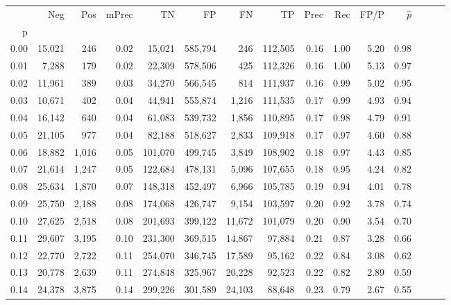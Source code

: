 \begin{tabular}{rrrrrrrrrrrrrrr}
\toprule
{} &     Neg &    Pos & mPrec &       TN &       FP &       FN &       TP &  Prec &   Rec &  FP/P & $\hat{p}$ \\
p    &         &        &       &          &          &          &          &       &       &       &           \\
\midrule
0.00 &  15,021 &    246 &  0.02 &   15,021 &  585,794 &      246 &  112,505 &  0.16 &  1.00 &  5.20 &      0.98 \\
0.01 &   7,288 &    179 &  0.02 &   22,309 &  578,506 &      425 &  112,326 &  0.16 &  1.00 &  5.13 &      0.97 \\
0.02 &  11,961 &    389 &  0.03 &   34,270 &  566,545 &      814 &  111,937 &  0.16 &  0.99 &  5.02 &      0.95 \\
0.03 &  10,671 &    402 &  0.04 &   44,941 &  555,874 &    1,216 &  111,535 &  0.17 &  0.99 &  4.93 &      0.94 \\
0.04 &  16,142 &    640 &  0.04 &   61,083 &  539,732 &    1,856 &  110,895 &  0.17 &  0.98 &  4.79 &      0.91 \\
0.05 &  21,105 &    977 &  0.04 &   82,188 &  518,627 &    2,833 &  109,918 &  0.17 &  0.97 &  4.60 &      0.88 \\
0.06 &  18,882 &  1,016 &  0.05 &  101,070 &  499,745 &    3,849 &  108,902 &  0.18 &  0.97 &  4.43 &      0.85 \\
0.07 &  21,614 &  1,247 &  0.05 &  122,684 &  478,131 &    5,096 &  107,655 &  0.18 &  0.95 &  4.24 &      0.82 \\
0.08 &  25,634 &  1,870 &  0.07 &  148,318 &  452,497 &    6,966 &  105,785 &  0.19 &  0.94 &  4.01 &      0.78 \\
0.09 &  25,750 &  2,188 &  0.08 &  174,068 &  426,747 &    9,154 &  103,597 &  0.20 &  0.92 &  3.78 &      0.74 \\
0.10 &  27,625 &  2,518 &  0.08 &  201,693 &  399,122 &   11,672 &  101,079 &  0.20 &  0.90 &  3.54 &      0.70 \\
0.11 &  29,607 &  3,195 &  0.10 &  231,300 &  369,515 &   14,867 &   97,884 &  0.21 &  0.87 &  3.28 &      0.66 \\
0.12 &  22,770 &  2,722 &  0.11 &  254,070 &  346,745 &   17,589 &   95,162 &  0.22 &  0.84 &  3.08 &      0.62 \\
0.13 &  20,778 &  2,639 &  0.11 &  274,848 &  325,967 &   20,228 &   92,523 &  0.22 &  0.82 &  2.89 &      0.59 \\
0.14 &  24,378 &  3,875 &  0.14 &  299,226 &  301,589 &   24,103 &   88,648 &  0.23 &  0.79 &  2.67 &      0.55 \\

\end{tabular}
